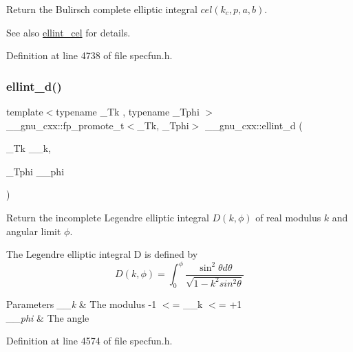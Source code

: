 Return the Bulirsch complete elliptic integral $ cel(k_c,p,a,b) $.

\begin{DoxySeeAlso}{See also}
\hyperlink{group__gnu__math__spec__func_ga6e44a0d90500e56ef4b3aba6efd7e2b0}{ellint\+\_\+cel} for details. 
\end{DoxySeeAlso}


Definition at line 4738 of file specfun.\+h.

\mbox{\label{group__gnu__math__spec__func_gad75103894786e6d7766bac4d8447b6cc}} 
\subsubsection{\texorpdfstring{ellint\+\_\+d()}{ellint\_d()}}
{\footnotesize\ttfamily template$<$typename \+\_\+\+Tk , typename \+\_\+\+Tphi $>$ \\
\+\_\+\+\_\+gnu\+\_\+cxx\+::fp\+\_\+promote\+\_\+t$<$\+\_\+\+Tk, \+\_\+\+Tphi$>$ \+\_\+\+\_\+gnu\+\_\+cxx\+::ellint\+\_\+d (\begin{DoxyParamCaption}\item[{\+\_\+\+Tk}]{\+\_\+\+\_\+k,  }\item[{\+\_\+\+Tphi}]{\+\_\+\+\_\+phi }\end{DoxyParamCaption})\hspace{0.3cm}{\ttfamily [inline]}}

Return the incomplete Legendre elliptic integral $ D(k,\phi) $ of real modulus $ k $ and angular limit $ \phi $.

The Legendre elliptic integral D is defined by \[ D(k,\phi) = \int_0^\phi \frac{\sin^2\theta d\theta}{\sqrt{1-k^2sin^2\theta}} \]


\begin{DoxyParams}{Parameters}
{\em \+\_\+\+\_\+k} & The modulus {\ttfamily -\/1 $<$= \+\_\+\+\_\+k $<$= +1} \\
\hline
{\em \+\_\+\+\_\+phi} & The angle \\
\hline
\end{DoxyParams}


Definition at line 4574 of file specfun.\+h.

\mbox{\label{group__gnu__math__spec__func_ga02ed50be21fdd84ad6bed003f94a9e69}} 
